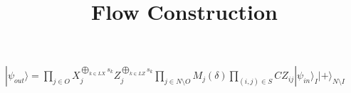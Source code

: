 \documentclass[10pts, a4paper]{article}
\title{ \begin{large}
\textbf{Flow Construction}
\end{large} 
}
\date{}
\begin{document}
\thispagestyle{empty}
$|\psi_{out}\rangle=\prod_{j\in O}X^{\bigoplus_{k\in LX}s_k}_j Z^{\bigoplus_{k\in LZ}s_k}_j \prod_{j\in N\setminus O} M_j(\delta) \prod_{(i,j) \in S} CZ_{ij}|\psi_{in}\rangle_{I}|+\rangle_{N\setminus I}$
\end{document}
